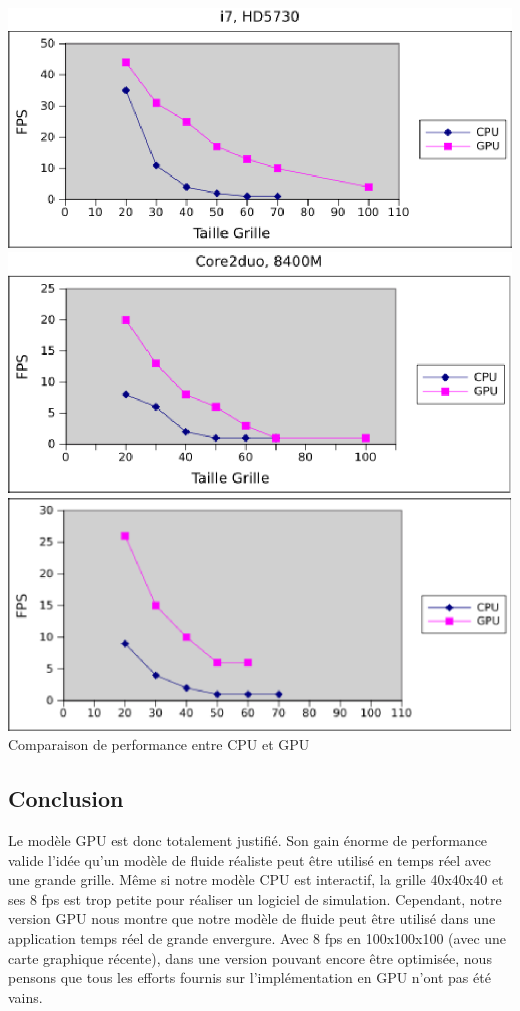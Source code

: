 \documentclass[a4paper,10pt]{article}
\begin{document}
  \begin{center}
	\includegraphics[scale=1]{Grille1.ps}\\
	\includegraphics[scale=1]{Grille2.ps}\\
	\includegraphics[scale=1]{Grille3.ps}\\
	Comparaison de performance entre CPU et GPU
  \end{center}
 




\subsection{Conclusion}
Le modèle GPU est donc totalement justifié. Son gain énorme de performance valide l'idée
qu'un modèle de fluide réaliste peut être utilisé en temps réel avec une grande grille. 
Même si notre modèle CPU est interactif, la grille 40x40x40 et ses 8 fps est
trop petite pour réaliser un logiciel de simulation. Cependant, notre version GPU
nous montre que notre modèle de fluide peut être utilisé dans une application 
temps réel de grande envergure. Avec 8 fps en 100x100x100 (avec une carte graphique récente), dans une version
pouvant encore être optimisée, nous pensons que tous les efforts fournis
sur l'implémentation en GPU n'ont pas été vains. 
\end{document}
